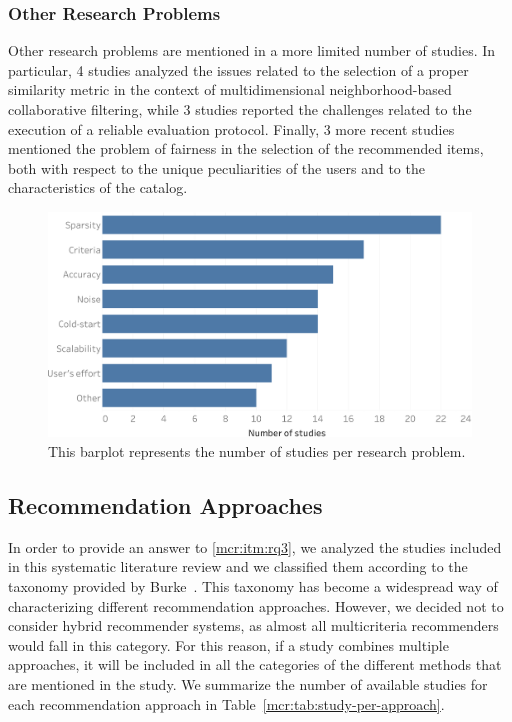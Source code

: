 \subsubsection{Other Research Problems}
Other research problems are mentioned in a more limited number of studies. In particular, 4 studies analyzed the issues related to the selection of a proper similarity metric in the context of multidimensional neighborhood-based collaborative filtering, while 3 studies reported the challenges related to the execution of a reliable evaluation protocol. Finally, 3 more recent studies mentioned the problem of fairness in the selection of the recommended items, both with respect to the unique peculiarities of the users and to the characteristics of the catalog.

\begin{figure}
\centering
\includegraphics[width=\textwidth]{problem_per_study}
\caption[Studies per research problem]{This barplot represents the number of studies per research problem.}
\label{mcr:fig:study-per-problem}
\end{figure}

\subsection{Recommendation Approaches}
\label{mcr:sec:approaches}

In order to provide an answer to \ref{mcr:itm:rq3}, we analyzed the studies included in this systematic literature review and we classified them according to the taxonomy provided by Burke~\cite{Burke2007}. This taxonomy has become a widespread way of characterizing different recommendation approaches. However, we decided not to consider hybrid recommender systems, as almost all multicriteria recommenders would fall in this category. For this reason, if a study combines multiple approaches, it will be included in all the categories of the different methods that are mentioned in the study. We summarize the number of available studies for each recommendation approach in Table~\ref{mcr:tab:study-per-approach}.

